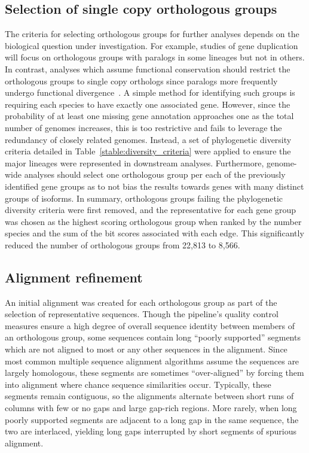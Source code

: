 \documentclass[10pt,letterpaper]{article}
\begin{document}
\subsection*{Selection of single copy orthologous groups}
The criteria for selecting orthologous groups for further analyses depends on the biological question under investigation. For example, studies of gene duplication will focus on orthologous groups with paralogs in some lineages but not in others. In contrast, analyses which assume functional conservation should restrict the orthologous groups to single copy orthologs since paralogs more frequently undergo functional divergence~\cite{Altenhoff2012, Pegueroles2013, Soria2014}. A simple method for identifying such groups is requiring each species to have exactly one associated gene. However, since the probability of at least one missing gene annotation approaches one as the total number of genomes increases, this is too restrictive and fails to leverage the redundancy of closely related genomes. Instead, a set of phylogenetic diversity criteria detailed in Table~\ref{stable:diversity_criteria} were applied to ensure the major lineages were represented in downstream analyses. Furthermore, genome-wide analyses should select one orthologous group per each of the previously identified gene groups as to not bias the results towards genes with many distinct groups of isoforms. In summary, orthologous groups failing the phylogenetic diversity criteria were first removed, and the representative for each gene group was chosen as the highest scoring orthologous group when ranked by the number species and the sum of the bit scores associated with each edge. This significantly reduced the number of orthologous groups from 22,813 to 8,566.

\subsection*{Alignment refinement}
An initial alignment was created for each orthologous group as part of the selection of representative sequences. Though the pipeline’s quality control measures ensure a high degree of overall sequence identity between members of an orthologous group, some sequences contain long “poorly supported” segments which are not aligned to most or any other sequences in the alignment. Since most common multiple sequence alignment algorithms assume the sequences are largely homologous, these segments are sometimes “over-aligned” by forcing them into alignment where chance sequence similarities occur. Typically, these segments remain contiguous, so the alignments alternate between short runs of columns with few or no gaps and large gap-rich regions. More rarely, when long poorly supported segments are adjacent to a long gap in the same sequence, the two are interlaced, yielding long gaps interrupted by short segments of spurious alignment.
\end{document}

